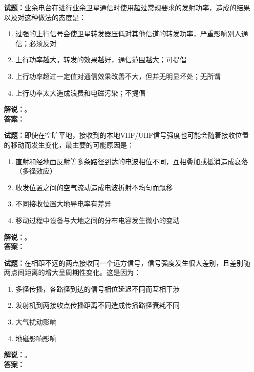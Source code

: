\documentclass{ctexbook}
\begin{document}
\bigskip




\noindent\textbf{试题：}业余电台在进行业余卫星通信时使用超过常规要求的发射功率，造成的结果以及对这种做法的态度是：
\begin{enumerate}[leftmargin=3em]
\item 过强的上行信号会使卫星转发器压低对其他信道的转发功率，严重影响别人通信；必须反对
\item 上行功率越大，转发的效果越好，通信范围越大；可提倡
\item 上行功率超过一定值对通信效果改善不大，但并无明显坏处；无所谓
\item 上行功率太大造成浪费和电磁污染；不提倡
\end{enumerate}
\noindent\textbf{解说：}\textbf{}。\\\noindent\textbf{答案：}

\bigskip




\noindent\textbf{试题：}即使在空旷平地，接收到的本地VHF/UHF信号强度也可能会随着接收位置的移动而发生变化，最主要的可能原因是：
\begin{enumerate}[leftmargin=3em]
\item 直射和经地面反射等多条路径到达的电波相位不同，互相叠加或抵消造成衰落（多径效应）
\item 收发位置之间的空气流动造成电波折射不均匀而飘移
\item 不同接收位置大地导电率有差异
\item 移动过程中设备与大地之间的分布电容发生微小的变动
\end{enumerate}
\noindent\textbf{解说：}\textbf{}。\\\noindent\textbf{答案：}

\bigskip




\noindent\textbf{试题：}在相距不远的两点接收同一个远方信号，信号强度发生很大差别，且差别随两点间距离的增大呈周期性变化。这是因为：
\begin{enumerate}[leftmargin=3em]
\item 多径传播，各路径到达的信号相位延迟不同而互相干涉
\item 发射机到两接收点传播距离不同造成传播路径衰耗不同
\item 大气扰动影响
\item 地磁影响影响
\end{enumerate}
\noindent\textbf{解说：}\textbf{}。\\\noindent\textbf{答案：}

\bigskip
\end{document}
